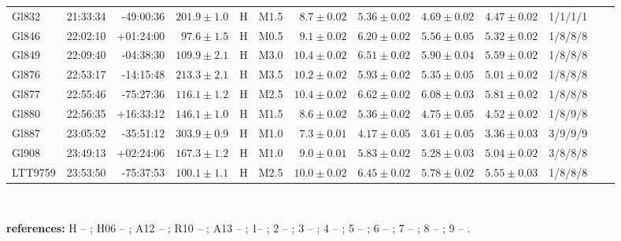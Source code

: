\documentclass{aa}
\begin{document}
\begin{table}[h!]
{\begin{tabular}{ l r r r c c r r r r r r r}
Gl832 & 21:33:34 & -49:00:36 & $201.9 \pm  1.0$ & H & M1.5 & $ 8.7 \pm 0.02$ & $5.36 \pm 0.02$ & $4.69 \pm 0.02$ & $4.47 \pm 0.02$ & 1/1/1/1 \\
Gl846 & 22:02:10 & +01:24:00 & $97.6 \pm  1.5$ & H & M0.5 & $ 9.1 \pm 0.02$ & $6.20 \pm 0.02$ & $5.56 \pm 0.05$ & $5.32 \pm 0.02$ & 1/8/8/8 \\
Gl849 & 22:09:40 & -04:38:30 & $109.9 \pm  2.1$ & H & M3.0 & $10.4 \pm 0.02$ & $6.51 \pm 0.02$ & $5.90 \pm 0.04$ & $5.59 \pm 0.02$ & 1/8/8/8 \\
Gl876 & 22:53:17 & -14:15:48 & $213.3 \pm  2.1$ & H & M3.5 & $10.2 \pm 0.02$ & $5.93 \pm 0.02$ & $5.35 \pm 0.05$ & $5.01 \pm 0.02$ & 1/8/8/8 \\
Gl877 & 22:55:46 & -75:27:36 & $116.1 \pm  1.2$ & H & M2.5 & $10.4 \pm 0.02$ & $6.62 \pm 0.02$ & $6.08 \pm 0.03$ & $5.81 \pm 0.02$ & 1/8/8/8 \\
Gl880 & 22:56:35 & +16:33:12 & $146.1 \pm  1.0$ & H & M1.5 & $ 8.6 \pm 0.02$ & $5.36 \pm 0.02$ & $4.75 \pm 0.05$ & $4.52 \pm 0.02$ & 1/8/9/8 \\
Gl887 & 23:05:52 & -35:51:12 & $303.9 \pm  0.9$ & H & M1.0 & $ 7.3 \pm 0.01$ & $4.17 \pm 0.05$ & $3.61 \pm 0.05$ & $3.36 \pm 0.03$ & 3/9/9/9 \\
Gl908 & 23:49:13 & +02:24:06 & $167.3 \pm  1.2$ & H & M1.0 & $ 9.0 \pm 0.01$ & $5.83 \pm 0.02$ & $5.28 \pm 0.03$ & $5.04 \pm 0.02$ & 3/8/8/8 \\
LTT9759 & 23:53:50 & -75:37:53 & $100.1 \pm  1.1$ & H & M2.5 & $10.0 \pm 0.02$ & $6.45 \pm 0.02$ & $5.78 \pm 0.02$ & $5.55 \pm 0.03$ & 1/8/8/8 \\
\hline
\hline
\end{tabular}
}
{
\\
\raggedright{
\textbf{references:} H -- \citep{van-Leeuwen-2007}; H06 -- \citet{Henry-2006}; A12 -- \citet{Anglada-Escude-2012}; R10 -- \citet{Riedel-2010}; A13 -- \citet{Anglada-Escude-2013}; 1-- \citet{Koen-2010}; 2 -- \citet{Henden-2009,Henden-2012}; 3 -- \citet{Perryman-1997}; 4 -- \citet{Weis-1993}; 5 -- \citet{Laing-1989}; 6 -- \citet{Fabricius-2002}; 7 -- \citet{Dawson-1992}; 8 -- \citet{Skrutskie-2006}; 9 -- \citet{Leggett-1992}. \\
}
}
\end{table}








\end{document}
